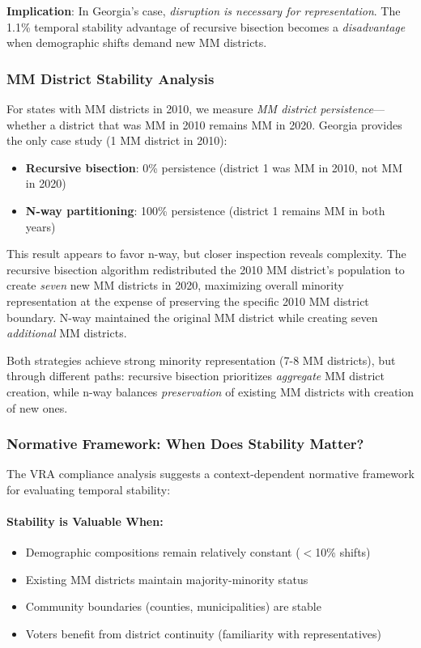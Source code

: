 \textbf{Implication}: In Georgia's case, \textit{disruption is necessary for representation}. The 1.1\% temporal stability advantage of recursive bisection becomes a \textit{disadvantage} when demographic shifts demand new MM districts.

\subsubsection{MM District Stability Analysis}

For states with MM districts in 2010, we measure \textit{MM district persistence}---whether a district that was MM in 2010 remains MM in 2020. Georgia provides the only case study (1 MM district in 2010):

\begin{itemize}
\item \textbf{Recursive bisection}: 0\% persistence (district 1 was MM in 2010, not MM in 2020)
\item \textbf{N-way partitioning}: 100\% persistence (district 1 remains MM in both years)
\end{itemize}

This result appears to favor n-way, but closer inspection reveals complexity. The recursive bisection algorithm redistributed the 2010 MM district's population to create \textit{seven} new MM districts in 2020, maximizing overall minority representation at the expense of preserving the specific 2010 MM district boundary. N-way maintained the original MM district while creating seven \textit{additional} MM districts.

Both strategies achieve strong minority representation (7-8 MM districts), but through different paths: recursive bisection prioritizes \textit{aggregate} MM district creation, while n-way balances \textit{preservation} of existing MM districts with creation of new ones.

\subsubsection{Normative Framework: When Does Stability Matter?}

The VRA compliance analysis suggests a context-dependent normative framework for evaluating temporal stability:

\paragraph{Stability is Valuable When:}
\begin{itemize}
\item Demographic compositions remain relatively constant ($<$10\% shifts)
\item Existing MM districts maintain majority-minority status
\item Community boundaries (counties, municipalities) are stable
\item Voters benefit from district continuity (familiarity with representatives)
\end{itemize}


